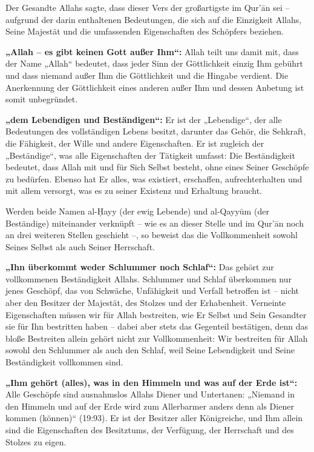 Der Gesandte Allahs  sagte, dass dieser Vers der großartigste im Qur’ān sei – aufgrund der
darin enthaltenen Bedeutungen, die sich auf die Einzigkeit Allahs, Seine Majestät und die
umfassenden Eigenschaften des Schöpfers beziehen.

\textbf{„Allah – es gibt keinen Gott außer Ihm“:} Allah teilt uns damit mit, dass der Name „Allah“
bedeutet, dass jeder Sinn der Göttlichkeit einzig Ihm gebührt und dass niemand außer Ihm die
Göttlichkeit und die Hingabe verdient. Die Anerkennung der Göttlichkeit eines anderen außer Ihm
und dessen Anbetung ist somit unbegründet.

\textbf{„dem Lebendigen und Beständigen“:} Er ist der „Lebendige“, der alle Bedeutungen des
vollständigen Lebens besitzt, darunter das Gehör, die Sehkraft, die Fähigkeit, der Wille und
andere Eigenschaften. Er ist zugleich der „Beständige“, was alle Eigenschaften der Tätigkeit
umfasst: Die Beständigkeit bedeutet, dass Allah mit und für Sich Selbst besteht, ohne eines
Seiner Geschöpfe zu bedürfen. Ebenso hat Er alles, was existiert, erschaffen, aufrechterhalten
und mit allem versorgt, was es zu seiner Existenz und Erhaltung braucht.

\begin{merke}
Werden beide Namen al-Ḥayy (der ewig Lebende) und al-Qayyūm (der Beständige) miteinander
verknüpft – wie es an dieser Stelle und im Qur’ān noch an drei weiteren Stellen geschieht –, so
beweist das die Vollkommenheit sowohl Seines Selbst als auch Seiner Herrschaft.
\end{merke}

\textbf{„Ihn überkommt weder Schlummer noch Schlaf“:} Das gehört zur vollkommenen
Beständigkeit Allahs. Schlummer und Schlaf überkommen nur jenes Geschöpf, das von Schwäche,
Unfähigkeit und Verfall betroffen ist – nicht aber den Besitzer der Majestät, des Stolzes und der
Erhabenheit. Verneinte Eigenschaften müssen wir für Allah bestreiten, wie Er Selbst und Sein
Gesandter  sie für Ihn bestritten haben – dabei aber stets das Gegenteil bestätigen, denn
das bloße Bestreiten allein gehört nicht zur Vollkommenheit: Wir bestreiten für Allah sowohl den
Schlummer als auch den Schlaf, weil Seine Lebendigkeit und Seine Beständigkeit vollkommen
sind.

\textbf{„Ihm gehört (alles), was in den Himmeln und was auf der Erde ist“:} Alle Geschöpfe sind
ausnahmslos Allahs Diener und Untertanen: „Niemand in den Himmeln und auf der Erde wird zum
Allerbarmer anders denn als Diener kommen (können)“ (19:93). Er ist der Besitzer aller
Königreiche, und Ihm allein sind die Eigenschaften des Besitztums, der Verfügung, der
Herrschaft und des Stolzes zu eigen.

